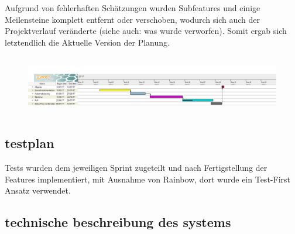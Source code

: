 \documentclass[12pt]{article}
\theoremstyle{plain}
\begin{document}
Aufgrund von fehlerhaften Schätzungen wurden Subfeatures und einige Meilensteine komplett entfernt oder verschoben, wodurch sich auch der Projektverlauf veränderte (siehe auch: was wurde verworfen). Somit ergab sich letztendlich die Aktuelle Version der Planung.
\begin{figure}[ht]
\centering
\includegraphics[width=1\textwidth, height=100px]{images/gant.png}
\end{figure}

\subsection{testplan}
Tests wurden dem jeweiligen Sprint zugeteilt und nach Fertigstellung der Features implementiert,
mit Ausnahme von Rainbow, dort wurde ein Test-First Ansatz verwendet.

\subsection{technische beschreibung des systems}
\end{document}
